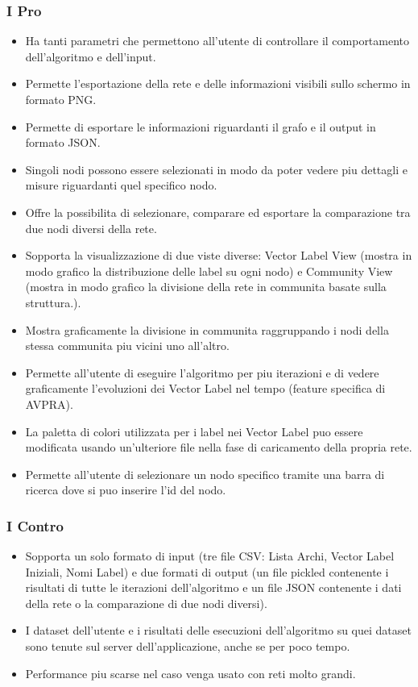 \documentclass[a4paper,12pt]{report}
\begin{document}
			\subsubsection*{I Pro}
				\begin{itemize}
					\item Ha tanti parametri che permettono all'utente di controllare il comportamento dell'algoritmo e dell'input.
					\item Permette l'esportazione della rete e delle informazioni visibili sullo schermo in formato PNG.
					\item Permette di esportare le informazioni riguardanti il grafo e il output in formato JSON.
					\item Singoli nodi possono essere selezionati in modo da poter vedere piu dettagli e misure riguardanti quel specifico nodo.
					\item Offre la possibilita di selezionare, comparare ed esportare la comparazione tra due nodi diversi della rete.
					\item Sopporta la visualizzazione di due viste diverse: Vector Label View (mostra in modo grafico la distribuzione delle label su ogni nodo) e Community View (mostra in modo grafico la divisione della rete in communita basate sulla struttura.).
					\item Mostra graficamente la divisione in communita raggruppando i nodi della stessa communita piu vicini uno all'altro.
					\item Permette all'utente di eseguire l'algoritmo per piu iterazioni e di vedere graficamente l'evoluzioni dei Vector Label nel tempo (feature specifica di AVPRA).
					\item La paletta di colori utilizzata per i label nei Vector Label puo essere modificata usando un'ulteriore file nella fase di caricamento della propria rete.
					\item Permette all'utente di selezionare un nodo specifico tramite una barra di ricerca dove si puo inserire l'id del nodo.
				\end{itemize}
						
			\subsubsection*{I Contro}
				\begin{itemize}
					\item Sopporta un solo formato di input (tre file CSV: Lista Archi, Vector Label Iniziali, Nomi Label) e due formati di output (un file pickled contenente i risultati di tutte le iterazioni dell'algoritmo e un file JSON contenente i dati della rete o la comparazione di due nodi diversi).
					\item I dataset dell'utente e i risultati delle esecuzioni dell'algoritmo su quei dataset sono tenute sul server dell'applicazione, anche se per poco tempo.
					\item Performance piu scarse nel caso venga usato con reti molto grandi.
				\end{itemize}
\end{document}
